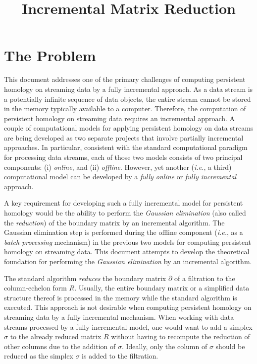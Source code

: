 \documentclass[11pt]{article}
\begin{document}
\title{Incremental Matrix Reduction}

\maketitle

\section{The Problem}

This document addresses one of the primary challenges of computing persistent homology on streaming 
data by a fully incremental approach.  As a data stream is a potentially infinite sequence of data 
objects, the entire stream cannot be stored in the memory typically available to a computer.  
Therefore, the computation of persistent homology on streaming data requires an incremental 
approach.  A couple of computational models for applying persistent homology on data streams are 
being developed as two separate projects that involve partially incremental approaches.  In 
particular, consistent with the standard computational paradigm \cite{silva-13} for processing 
data streams, each of those two models consists of two principal components: (i) \emph{online}, and 
(ii) \emph{offline}.  However, yet another (\emph{i.e.}, a third) computational model can be 
developed by a \emph{fully online} or \emph{fully incremental} approach.


A key requirement for developing such a fully incremental model for persistent homology would be 
the ability to perform the \emph{Gaussian elimination} (also called the \emph{reduction}) of the 
boundary matrix \cite{edelsbrunner-00, zomorodian-05} by an incremental algorithm.  The Gaussian 
elimination step is performed during the offline component (\emph{i.e.}, as a \emph{batch 
processing} mechanism) in the previous two models for computing persistent homology on streaming 
data.  This document attempts to develop the theoretical foundation for performing the 
\emph{Gaussian elimination} by an incremental algorithm.


The standard algorithm \cite{edelsbrunner-00, zomorodian-05} \emph{reduces} the boundary matrix 
$\partial$ of a filtration \cite{zomorodian-10} to the column-echelon form $R$.  Usually, the 
entire boundary matrix or a simplified data structure thereof is processed in the memory while the 
standard algorithm is executed.  This approach is not desirable when computing persistent homology 
on streaming data by a fully incremental mechanism.  When working with data streams processed by a 
fully incremental model, one would want to add a simplex $\sigma$ to the already reduced matrix $R$ 
without having to recompute the reduction of other columns due to the addition of $\sigma$.  
Ideally, only the column of $\sigma$ should be reduced as the simplex $\sigma$ is added to the 
filtration.
\end{document}
